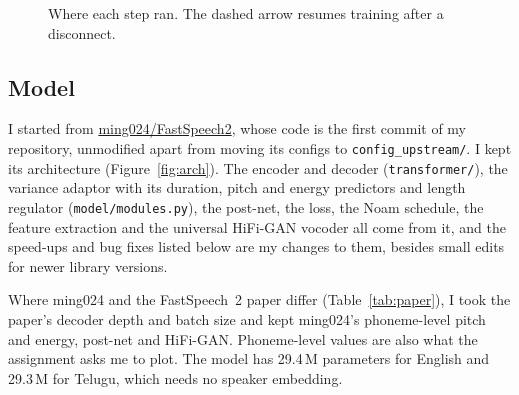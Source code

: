 \documentclass[11pt,a4paper]{article}
\newcommand{\code}[1]{\texttt{#1}}
\begin{document}
\begin{figure}[!htbp]
\caption{Where each step ran. The dashed arrow resumes training after a disconnect.}
\label{fig:pipeline}
\end{figure}

\subsection{Model}
I started from \href{https://github.com/ming024/FastSpeech2}{ming024/FastSpeech2}, whose code is the first
commit of my repository, unmodified apart from moving its configs to \code{config\_upstream/}. I kept its architecture (Figure~\ref{fig:arch}). The encoder and decoder
(\code{transformer/}), the variance adaptor with its duration, pitch and energy predictors and length regulator
(\code{model/modules.py}), the post-net, the loss, the Noam schedule, the feature extraction and the universal
HiFi-GAN vocoder all come from it, and the speed-ups and bug fixes listed below are my changes to them, besides small edits for newer library versions.

Where ming024 and the FastSpeech~2 paper differ (Table~\ref{tab:paper}), I took the paper's decoder depth and
batch size and kept ming024's phoneme-level pitch and energy, post-net and HiFi-GAN. Phoneme-level values are
also what the assignment asks me to plot. The model has 29.4\,M parameters for English and 29.3\,M for Telugu,
which needs no speaker embedding.
\end{document}
